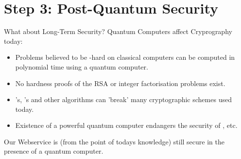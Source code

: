 \section{Step 3: Post-Quantum Security}
\begin{frame}{What about Long-Term Security?}
  Quantum Computers affect Cryprography today:
  \begin{itemize}
    \item Problems believed to be -hard on classical computers can be computed in polynomial time using a quantum computer.
    \item No hardness proofs of the RSA or integer factorisation problems exist.
    \item {}'s, 's and other algorithms can 'break' many cryptographic schemes used today.
    \item Existence of a powerful quantum computer endangers the security of , etc.
  \end{itemize}
  Our Webservice is (from the point of todays knowledge) still secure in the presence of a quantum computer.
\end{frame}
